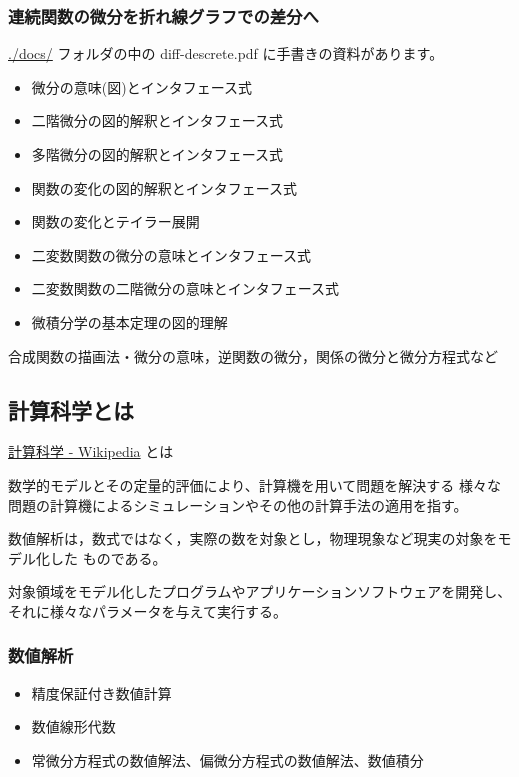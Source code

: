 \documentclass[dvipdfmx,11pat]{jarticle}
\begin{document}
\subsubsection{連続関数の微分を折れ線グラフでの差分へ}
\label{sec:org921988a}

\url{./docs/} フォルダの中の diff-descrete.pdf に手書きの資料があります。

\begin{itemize}
\item 微分の意味(図)とインタフェース式
\item 二階微分の図的解釈とインタフェース式
\item 多階微分の図的解釈とインタフェース式
\item 関数の変化の図的解釈とインタフェース式
\item 関数の変化とテイラー展開
\item 二変数関数の微分の意味とインタフェース式
\item 二変数関数の二階微分の意味とインタフェース式
\item 微積分学の基本定理の図的理解
\end{itemize}

合成関数の描画法・微分の意味，逆関数の微分，関係の微分と微分方程式など
\subsection{計算科学とは}
\label{sec:org3491d8d}

\href{https://ja.wikipedia.org/wiki/\%E8\%A8\%88\%E7\%AE\%97\%E7\%A7\%91\%E5\%AD\%A6}{計算科学 - Wikipedia} とは

数学的モデルとその定量的評価により、計算機を用いて問題を解決する
様々な問題の計算機によるシミュレーションやその他の計算手法の適用を指す。


数値解析は，数式ではなく，実際の数を対象とし，物理現象など現実の対象をモデル化した
ものである。

対象領域をモデル化したプログラムやアプリケーションソフトウェアを開発し、
それに様々なパラメータを与えて実行する。
\subsubsection{数値解析}
\label{sec:orgd15f756}
\begin{itemize}
\item 精度保証付き数値計算
\item 数値線形代数
\item 常微分方程式の数値解法、偏微分方程式の数値解法、数値積分
\end{itemize}
\end{document}
